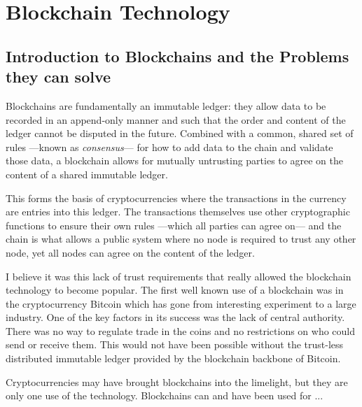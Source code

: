 
\chapter{Blockchain Technology}
\label{ch:blockchain}

\section{Introduction to Blockchains and the Problems they can solve}
\label{ch:blockchain:intro}

Blockchains are fundamentally an immutable ledger: they allow data to be recorded in an append-only manner and such that the order and content of the ledger cannot be disputed in the future. Combined with a common, shared set of rules ---known as \emph{consensus}--- for how to add data to the chain and validate those data, a blockchain allows for mutually untrusting parties to agree on the content of a shared immutable ledger.

This forms the basis of cryptocurrencies where the transactions in the currency are entries into this ledger. The transactions themselves use other cryptographic functions to ensure their own rules ---which all parties can agree on--- and the chain is what allows a public system where no node is required to trust any other node, yet all nodes can agree on the content of the ledger.

I believe it was this lack of trust requirements that really allowed the blockchain technology to become popular. The first well known use of a blockchain was in the cryptocurrency Bitcoin \cite{nakamoto_bitcoin_2008} which has gone from interesting experiment to a large industry. One of the key factors in its success was the lack of central authority. There was no way to regulate trade in the coins and no restrictions on who could send or receive them. This would not have been possible without the trust-less distributed immutable ledger provided by the blockchain backbone of Bitcoin.

Cryptocurrencies may have brought blockchains into the limelight, but they are only one use of the technology. Blockchains can and have been used for ... 



